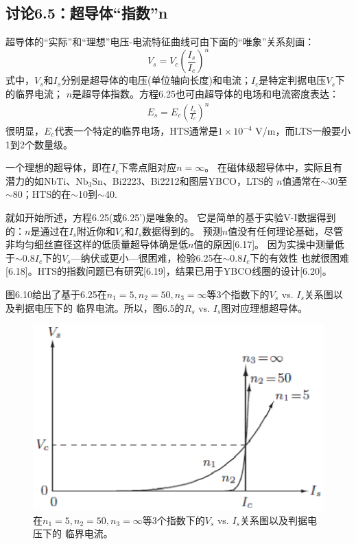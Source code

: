\subsection{讨论6.5：超导体“指数”n}
超导体的“实际”和“理想”电压-电流特征曲线可由下面的“唯象”关系刻画：
\begin{equation}%
V_s=V_c(\frac{I_s}{I_c})^n
\end{equation}
式中，$V_s$和$I_s$分别是超导体的电压(单位轴向长度)和电流；$I_c$是特定判据电压$V_s$下的临界电流；
$n$是超导体指数。方程6.25也可由超导体的电场和电流密度表达：
\begin{align*}%
E_s=E_c(\frac{I_s}{I_c})^n \tag{6.25'}
\end{align*}
很明显，$E_c$代表一个特定的临界电场，HTS通常是$1\times 10^{-4}$ V/m，而LTS一般要小1到2个数量级。

一个理想的超导体，即在$I_c$下零点阻对应$n=\infty$。
在磁体级超导体中，实际且有潜力的如NbTi、$\mathrm{Nb_3 Sn}$、Bi2223、Bi2212和图层YBCO，LTS的
$n$值通常在$\sim$30至$\sim$80；HTS的在$\sim$10到$\sim$40.

就如开始所述，方程6.25(或6.25')是唯象的。
它是简单的基于实验V-I数据得到的：$n$是通过在$I_s$附近你和$V_s$和$I_s$数据得到的。
预测$n$值没有任何理论基础，尽管非均匀细丝直径这样的低质量超导体确是低$n$值的原因[6.17]。
因为实操中测量低于$\sim 0.8 I_c$下的$V_s$---纳伏或更小---很困难，检验6.25在$\sim 0.8 I_c$下的有效性
也就很困难[6.18]。HTS的指数问题已有研究[6.19]，结果已用于YBCO线圈的设计[6.20]。

图6.10给出了基于6.25在$n_1=5,n_2=50,n_3=\infty$等3个指数下的$V_s$ vs. $I_s$关系图以及判据电压下的
临界电流。所以，图6.5的$R_s$ vs. $I_s$图对应理想超导体。
\begin{figure}[htbp]
	\centering
	\includegraphics[scale=0.7]{chpt6/figs/fig6.10.eps}
	\caption{在$n_1=5,n_2=50,n_3=\infty$等3个指数下的$V_s$ vs. $I_s$关系图以及判据电压下的
		临界电流。}
\end{figure}

